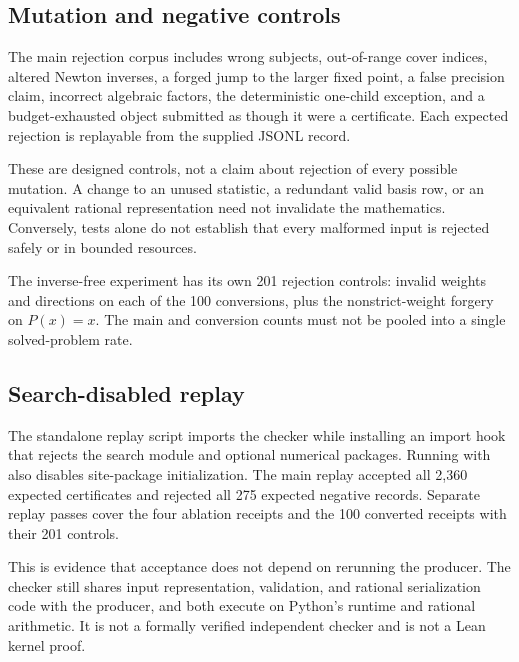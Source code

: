 \subsection{Mutation and negative controls}
The main rejection corpus includes wrong subjects, out-of-range cover indices, altered Newton inverses, a forged jump to the larger fixed point, a false precision claim, incorrect algebraic factors, the deterministic one-child exception, and a budget-exhausted object submitted as though it were a certificate. Each expected rejection is replayable from the supplied JSONL record.

These are designed controls, not a claim about rejection of every possible mutation. A change to an unused statistic, a redundant valid basis row, or an equivalent rational representation need not invalidate the mathematics. Conversely, tests alone do not establish that every malformed input is rejected safely or in bounded resources.

The inverse-free experiment has its own 201 rejection controls: invalid weights and directions on each of the 100 conversions, plus the nonstrict-weight forgery on $P(x)=x$. The main and conversion counts must not be pooled into a single solved-problem rate.

\subsection{Search-disabled replay}
The standalone replay script imports the checker while installing an import hook that rejects the search module and optional numerical packages. Running with  also disables site-package initialization. The main replay accepted all 2,360 expected certificates and rejected all 275 expected negative records. Separate replay passes cover the four ablation receipts and the 100 converted receipts with their 201 controls.

This is evidence that acceptance does not depend on rerunning the producer. The checker still shares input representation, validation, and rational serialization code with the producer, and both execute on Python's runtime and rational arithmetic. It is not a formally verified independent checker and is not a Lean kernel proof.


